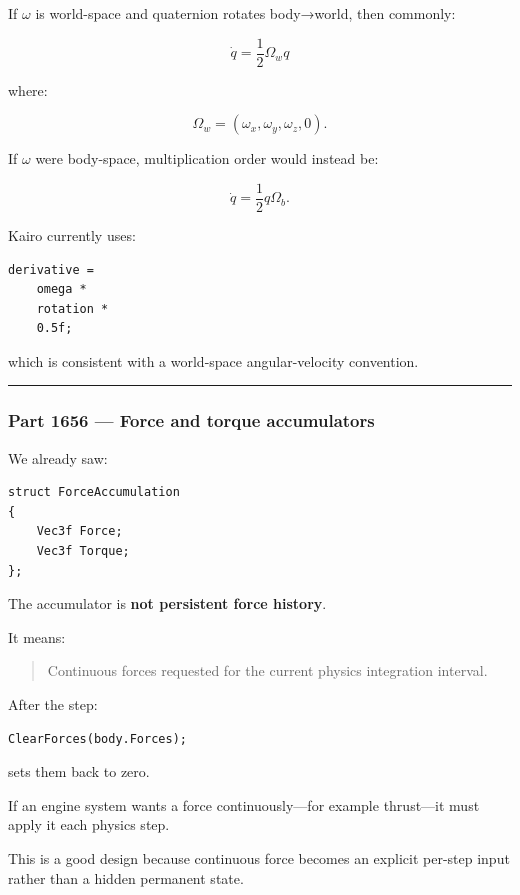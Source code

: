If \(\omega\) is world-space and quaternion rotates body→world, then commonly:

\[
\boxed{
\dot q
=
\frac12
\Omega_w q
}
\]

where:

\[
\Omega_w=(\omega_x,\omega_y,\omega_z,0).
\]

If \(\omega\) were body-space, multiplication order would instead be:

\[
\dot q
=
\frac12
q\Omega_b.
\]

Kairo currently uses:

\begin{verbatim}
derivative =
    omega *
    rotation *
    0.5f;
\end{verbatim}

which is consistent with a world-space angular-velocity convention.

\begin{center}\rule{0.5\linewidth}{0.5pt}\end{center}

\subsubsection{Part 1656 --- Force and torque accumulators}\label{part-1656-force-and-torque-accumulators}

We already saw:

\begin{verbatim}
struct ForceAccumulation
{
    Vec3f Force;
    Vec3f Torque;
};
\end{verbatim}

The accumulator is \textbf{not persistent force history}.

It means:

\begin{quote}
Continuous forces requested for the current physics integration interval.
\end{quote}

After the step:

\begin{verbatim}
ClearForces(body.Forces);
\end{verbatim}

sets them back to zero.

If an engine system wants a force continuously---for example thrust---it must apply it each physics step.

This is a good design because continuous force becomes an explicit per-step input rather than a hidden permanent state.

